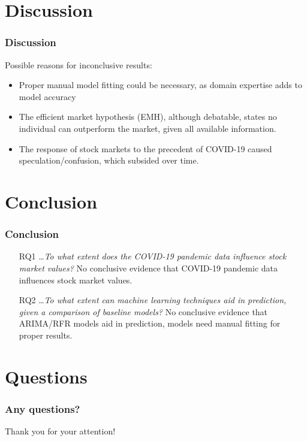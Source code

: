 \documentclass[aspectratio=169,classic]{uva-inf-presentation}
\begin{document}
\section{Discussion}
\begin{frame}
\frametitle{Discussion}
Possible reasons for inconclusive results:
\begin{itemize}
    \item Proper manual model fitting could be necessary, as domain expertise adds to model accuracy
    \item The efficient market hypothesis (EMH), although debatable, states no individual can outperform the market, given all available information.
    \item The response of stock markets to the precedent of COVID-19 caused speculation/confusion, which subsided over time.
\end{itemize}
\end{frame}



\section{Conclusion}
\begin{frame}
\frametitle{Conclusion}
\begin{itemize}
    \item[RQ1] \ldots \textit{To what extent does the COVID-19 pandemic data influence stock market values?} \newline
    No conclusive evidence that COVID-19 pandemic data influences stock market values.
    \item[RQ2] \ldots \textit{To what extent can machine learning techniques aid in prediction, given a comparison of baseline models?} \newline
    No conclusive evidence that ARIMA/RFR models aid in prediction, models need manual fitting for proper results.
\end{itemize}
\end{frame}



\section{Questions}
\begin{frame}
\frametitle{Any questions?}
Thank you for your attention!
\end{frame}
\end{document}
